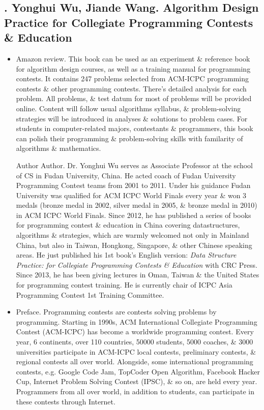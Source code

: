 \documentclass{article}
\begin{document}

\subsection{\cite{Wu_Wang2018}. {\sc Yonghui Wu, Jiande Wang}. Algorithm Design Practice for Collegiate Programming Contests \& Education}

\begin{itemize}
	\item {\sf Amazon review.} This book can be used as an experiment \& reference book for algorithm design courses, as well as a training manual for programming contests. It contains 247 problems selected from ACM-ICPC programming contests \& other programming contests. There's detailed analysis for each problem. All problems, \& test datum for most of problems will be provided online. Content will follow usual algorithms syllabus, \& problem-solving strategies will be introduced in analyses \& solutions to problem cases. For students in computer-related majors, contestants \& programmers, this book can polish their programming \& problem-solving skills with familarity of algorithms \& mathematics.
	
	{\sf Author Author.} Dr. {\sc Yonghui Wu} serves as Associate Professor at the school of CS in Fudan University, China. He acted coach of Fudan University Programming Contest teams from 2001 to 2011. Under his guidance Fudan University was qualified for ACM ICPC World Finals every year \& won 3 medals (bronze medal in 2002, silver medal in 2005, \& bronze medal in 2010) in ACM ICPC World Finals. Since 2012, he has published a series of books for programming contest \& education in China covering datastructures, algorithms \& strategies, which are warmly welcomed not only in Mainland China, but also in Taiwan, Hongkong, Singapore, \& other Chinese speaking areas. He just published his 1st book's English version: {\it Data Structure Practice: for Collegiate Programming Contests \& Education} with CRC Press. Since 2013, he has been giving lectures in Oman, Taiwan \& the United States for programming contest training. He is currently chair of ICPC Asia Programming Contest 1st Training Committee.
	\item {\sf Preface.} Programming contests are contests solving problems by programming. Starting in 1990s, ACM International Collegiate Programming Contest (ACM-ICPC) has become a worldwide programming contest. Every year, 6 continents, over 110 countries, 50000 students, 5000 coaches, \& 3000 universities participate in ACM-ICPC local contests, preliminary contests, \& regional contests all over world. Alongside, some international programming contests, e.g. Google Code Jam, TopCoder Open Algorithm, Facebook Hacker Cup, Internet Problem Solving Contest (IPSC), \& so on, are held every year. Programmers from all over world, in addition to students, can participate in these contests through Internet.
	

\end{itemize}
\end{document}
